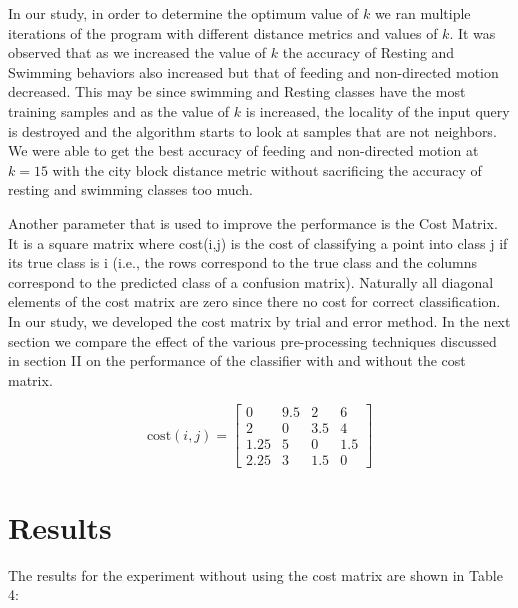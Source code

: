 \documentclass[conference]{IEEEtran}
\begin{document}
In our study, in order to determine the optimum value of $k$ we ran multiple iterations of the program with different distance metrics and values of $k$. It was observed that as we increased the value of $k$ the accuracy of Resting and Swimming behaviors also increased but that of feeding and non-directed motion decreased. This may be since swimming and Resting classes have the most training samples and as the value of $k$ is increased, the locality of the input query is destroyed and the algorithm starts to look at samples that are not neighbors.  We were able to get the best accuracy of feeding and non-directed motion at $k = 15$ with the city block distance metric without sacrificing the accuracy of resting and swimming classes too much.

Another parameter that is used to improve the performance is the Cost Matrix. It is a square matrix where cost(i,j) is the cost of classifying a point into class j if its true class is i (i.e., the rows correspond to the true class and the columns correspond to the predicted class of a confusion matrix). Naturally all diagonal elements of the cost matrix are zero since there no cost for correct classification. In our study, we developed the cost matrix by trial and error method. In the next section we compare the effect of the various pre-processing techniques discussed in section II on the performance of the classifier with and without the cost matrix.

$$
\mathrm{cost}(i, j) = \begin{bmatrix}
	0 & 9.5 & 2 & 6 \\
	2 & 0 & 3.5 & 4 \\
	1.25 & 5 & 0 & 1.5 \\
	2.25 & 3 & 1.5 & 0
\end{bmatrix}
$$

\section{Results}

The results for the experiment without using the cost matrix are shown in Table 4:
\end{document}
